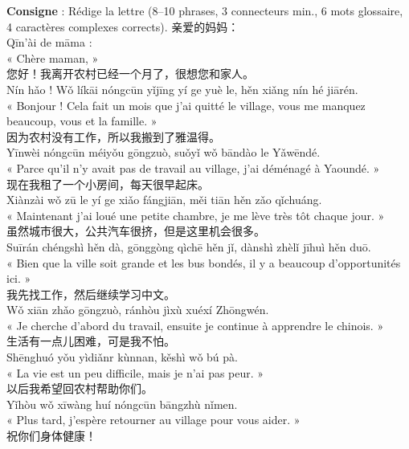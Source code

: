 \documentclass[11pt]{article}
\begin{document}
\begin{exoresolu}
\textbf{Consigne} : Rédige la lettre (8--10 phrases, 3 connecteurs min., 6 mots glossaire, 4 caractères complexes corrects).
\tcblower
亲爱的妈妈：\\
Qīn'ài de māma :\\
« Chère maman, »\\[4pt]
您好！我离开农村已经一个月了，很想您和家人。\\
Nín hǎo ! Wǒ líkāi nóngcūn yǐjīng yí ge yuè le, hěn xiǎng nín hé jiārén.\\
« Bonjour ! Cela fait un mois que j'ai quitté le village, vous me manquez beaucoup, vous et la famille. »\\[4pt]
因为农村没有工作，所以我搬到了雅温得。\\
Yīnwèi nóngcūn méiyǒu gōngzuò, suǒyǐ wǒ bāndào le Yǎwēndé.\\
« Parce qu'il n'y avait pas de travail au village, j'ai déménagé à Yaoundé. »\\[4pt]
现在我租了一个小房间，每天很早起床。\\
Xiànzài wǒ zū le yí ge xiǎo fángjiān, měi tiān hěn zǎo qǐchuáng.\\
« Maintenant j'ai loué une petite chambre, je me lève très tôt chaque jour. »\\[4pt]
虽然城市很大，公共汽车很挤，但是这里机会很多。\\
Suīrán chéngshì hěn dà, gōnggòng qìchē hěn jǐ, dànshì zhèlǐ jīhuì hěn duō.\\
« Bien que la ville soit grande et les bus bondés, il y a beaucoup d'opportunités ici. »\\[4pt]
我先找工作，然后继续学习中文。\\
Wǒ xiān zhǎo gōngzuò, ránhòu jìxù xuéxí Zhōngwén.\\
« Je cherche d'abord du travail, ensuite je continue à apprendre le chinois. »\\[4pt]
生活有一点儿困难，可是我不怕。\\
Shēnghuó yǒu yìdiǎnr kùnnan, kěshì wǒ bú pà.\\
« La vie est un peu difficile, mais je n'ai pas peur. »\\[4pt]
以后我希望回农村帮助你们。\\
Yǐhòu wǒ xīwàng huí nóngcūn bāngzhù nǐmen.\\
« Plus tard, j'espère retourner au village pour vous aider. »\\[4pt]
祝你们身体健康！\\

\end{exoresolu}
\end{document}
